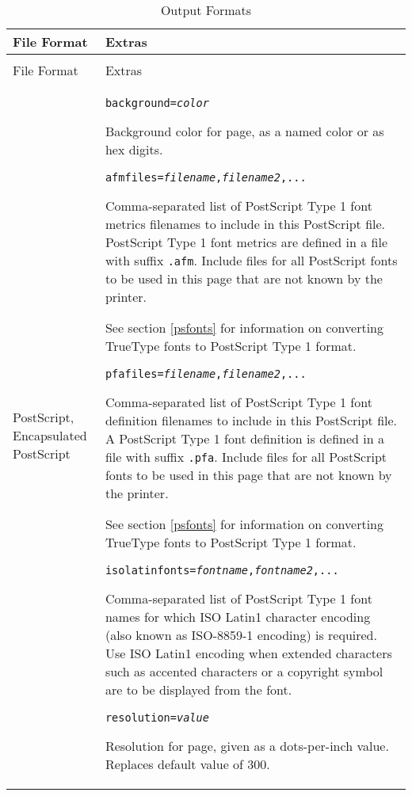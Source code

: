 \begin{longtable}{|p{4cm}|p{10cm}|}
\hline
\label{outputformats}
File Format & Extras \\
\hline
\hline
\endfirsthead
\hline
\caption{Output Formats} \\
\endfoot

\hline
File Format & Extras \\
\hline
\hline
\endhead

PostScript, Encapsulated PostScript &

\texttt{background=\textit{color}}

Background color for page, as a named color or as hex digits.

\vspace{10pt}
\texttt{afmfiles=\textit{filename},\textit{filename2},...}

Comma-separated list of PostScript Type 1 font metrics filenames
to include in this PostScript file.
PostScript Type 1 font metrics are defined in a file
with suffix \texttt{.afm}.  Include
files for all PostScript fonts to be used in this
page that are not known by the printer.

See section \ref{psfonts} for
information on converting TrueType fonts to PostScript Type 1 format.

\vspace{10pt}
\texttt{pfafiles=\textit{filename},\textit{filename2},...}

Comma-separated list of PostScript Type 1 font definition filenames
to include in this PostScript file.
A PostScript Type 1 font definition is defined in a file
with suffix \texttt{.pfa}.  Include
files for all PostScript fonts to be used in this
page that are not known by the printer.

See section \ref{psfonts} for
information on converting TrueType fonts to PostScript Type 1 format.

\vspace{10pt}
\texttt{isolatinfonts=\textit{fontname},\textit{fontname2},...}

Comma-separated list of PostScript Type 1 font names for
which ISO Latin1 character encoding
(also known as ISO-8859-1 encoding)
is required.  Use ISO Latin1 encoding
when extended characters such as accented characters
or a copyright symbol are to be displayed from the font.

\vspace{10pt}
\texttt{resolution=\textit{value}}

Resolution for page, given as a dots-per-inch value.  Replaces
default value of 300.


\end{longtable}
